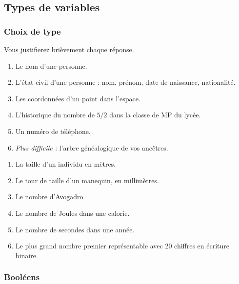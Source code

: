 \ifprof
\vspace{1cm}
\else
\begin{multicols}{2}
\fi

\subsection*{Types de variables}
\subsubsection*{Choix de type}

Vous justifierez brièvement chaque réponse. 

\begin{enumerate}[label = \emph{\alph*)}]
  \item Le nom d'une personne.
  \item L'état civil d'une personne : nom, prénom, date de naissance, nationalité.
  \item Les coordonnées d'un point dans l'espace.
  \item L'historique du nombre de $5/2$ dans la classe de MP du lycée. 
  \item Un numéro de téléphone. 
  \item \emph{Plus difficile :} l'arbre généalogique de vos ancêtres. 
\end{enumerate}



\begin{enumerate}[label=\emph{\alph*)}]
  \item La taille d'un individu en mètres. 
  \item Le tour de taille d'un manequin, en millimètres.
  \item Le nombre d'Avogadro.
  \item Le nombre de Joules dans une calorie.
  \item Le nombre de secondes dans une année.
  \item Le plus grand nombre premier représentable avec 20 chiffres en écriture binaire.
\end{enumerate}

\subsubsection*{Booléens}
\setcounter{numques}{0}


\end{multicols}
